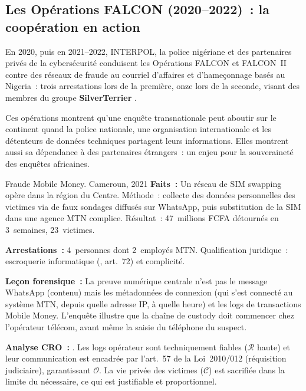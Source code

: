 \subsection{Les Opérations FALCON (2020--2022)~: la coopération en action}

En 2020, puis en 2021--2022, INTERPOL, la police nigériane et des
partenaires privés de la cybersécurité conduisent les Opérations FALCON et
FALCON~II contre des réseaux de fraude au courriel d'affaires et
d'hameçonnage basés au Nigeria~: trois arrestations lors de la première,
onze lors de la seconde, visant des membres du groupe \textbf{SilverTerrier}
\cite{interpol2020falcon,interpol2022falcon}.

\medskip

Ces opérations montrent qu'une enquête transnationale peut aboutir sur le
continent quand la police nationale, une organisation internationale et
les détenteurs de données techniques partagent leurs informations. Elles
montrent aussi sa dépendance à des partenaires étrangers~: un enjeu pour
la souveraineté des enquêtes africaines.

\begin{boxscenario}{Fraude Mobile Money. Cameroun, 2021}
\textbf{Faits~:} Un réseau de SIM swapping opère dans la région du Centre.
Méthode~: collecte des données personnelles des victimes via de faux sondages
diffusés sur WhatsApp, puis substitution de la SIM dans une agence MTN
complice. Résultat~: 47~millions FCFA détournés en 3~semaines, 23~victimes.

\textbf{Arrestations~:} 4~personnes dont 2~employés MTN. Qualification
juridique~: escroquerie informatique (, art.~72)
et complicité.

\textbf{Leçon forensique~:} La preuve numérique centrale n'est pas le
message WhatsApp (contenu) mais les métadonnées de connexion (qui s'est
connecté au système MTN, depuis quelle adresse IP, à quelle heure) et
les logs de transactions Mobile Money. L'enquête illustre que la chaîne
de custody doit commencer chez l'opérateur télécom, avant même la
saisie du téléphone du suspect.

\textbf{Analyse CRO~:} \cro{$\downarrow$}{$\uparrow$}{$\uparrow$}. Les logs
opérateur sont techniquement fiables ($\mathcal{R}$ haute) et leur
communication est encadrée par l'art.~57 de la Loi~2010/012 (réquisition
judiciaire), garantissant $\mathcal{O}$. La vie privée des victimes
($\mathcal{C}$) est sacrifiée dans la limite du nécessaire, ce qui est
justifiable et proportionnel.
\end{boxscenario}


